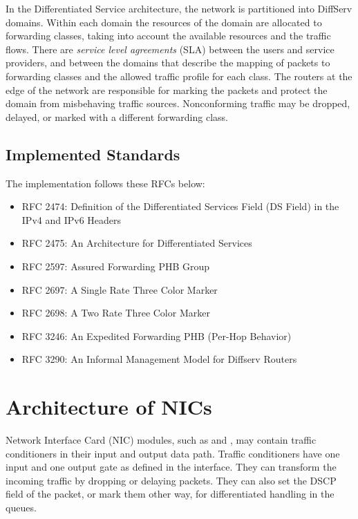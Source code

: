 In the Differentiated Service architecture, the network is partitioned into
DiffServ domains. Within each domain the resources of the domain are allocated
to forwarding classes, taking into account the available resources and the
traffic flows. There are \textit{service level agreements} (SLA) between the users
and service providers, and between the domains that describe the mapping of
packets to forwarding classes and the allowed traffic profile for each class.
The routers at the edge of the network are responsible for marking the packets
and protect the domain from misbehaving traffic sources. Nonconforming traffic
may be dropped, delayed, or marked with a different forwarding class.


\subsection{Implemented Standards}
\label{sec:diffserv:implemented-standards}

The implementation follows these RFCs below:

\begin{itemize}
  \item RFC 2474: Definition of the Differentiated Services Field (DS Field) in the IPv4 and IPv6 Headers
  \item RFC 2475: An Architecture for Differentiated Services
  \item RFC 2597: Assured Forwarding PHB Group
  \item RFC 2697: A Single Rate Three Color Marker
  \item RFC 2698: A Two Rate Three Color Marker
  \item RFC 3246: An Expedited Forwarding PHB (Per-Hop Behavior)
  \item RFC 3290: An Informal Management Model for Diffserv Routers
\end{itemize}

\section{Architecture of NICs}
\label{sec:diffserv:architecture-of-nics}

Network Interface Card (NIC) modules, such as  and
, may contain traffic conditioners in
their input and output data path. Traffic conditioners have one input
and one output gate as defined in the 
interface. They can transform the incoming traffic by dropping or
delaying packets. They can also set the DSCP field of the packet,
or mark them other way, for differentiated handling in the queues.

